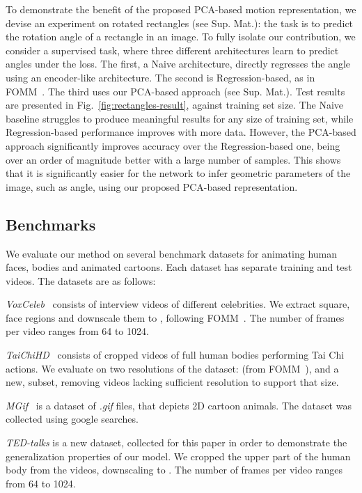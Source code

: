 \documentclass[final]{cvpr}
\begin{document}
To demonstrate the benefit of the proposed PCA-based motion representation, we devise an experiment on rotated rectangles (see Sup. Mat.): the task is to predict the rotation angle of a rectangle in an image. To fully isolate our contribution, we consider a supervised task, where three different architectures learn to predict angles under the  loss. The first, a Naive architecture, directly regresses the angle using an encoder-like architecture. The second is Regression-based, as in FOMM~\cite{fomm}. The third uses our PCA-based approach (see Sup. Mat.). Test results are presented in Fig.~\ref{fig:rectangles-result}, against training set size. The Naive baseline struggles to produce meaningful results for any size of training set, while Regression-based performance improves with more data. However, the PCA-based approach significantly improves accuracy over the Regression-based one, being over an order of magnitude better with a large number of samples. This shows that it is significantly easier for the network to infer geometric parameters of the image, such as angle, using our proposed PCA-based representation.

\subsection{Benchmarks}
We evaluate our method on several benchmark datasets for animating human faces, bodies and animated cartoons. 
Each dataset has separate training and test videos. The datasets are as follows:
\begin{itemize*}
\item\emph{VoxCeleb}~\cite{Nagrani17} consists of interview videos of different celebrities. We extract square, face regions and downscale them to , following FOMM~\cite{fomm}. The number of frames per video ranges from 64 to 1024.
\item\emph{TaiChiHD}~\cite{fomm} consists of cropped videos of full human bodies performing Tai Chi actions. We evaluate on two resolutions of the dataset:  (from FOMM~\cite{fomm}), and a new,  subset, removing videos lacking sufficient resolution to support that size.
\item\emph{MGif}~\cite{siarohin2018animating} is a dataset of \emph{.gif} files, that depicts 2D cartoon animals. The dataset was collected using google searches.
\item\emph{TED-talks} is a new dataset, collected for this paper in order to demonstrate the generalization properties of our model. We cropped the upper part of the human body from the videos, downscaling to . The number of frames per video ranges from 64 to 1024.
\end{itemize*}
\end{document}
